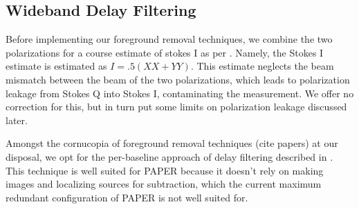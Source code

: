 \documentclass[twocolumn,numberedappendix]{emulateapj} \shorttitle{PSA64}
\begin{document}
%
%



\subsection{Wideband Delay Filtering}\label{sec:wbd_filtering}


Before implementing our foreground removal techniques, we combine the two
polarizations for a course estimate of stokes I as per \cite{moore_et_al2013}.
Namely, the Stokes I estimate is estimated as $I = .5(XX+YY)$. This estimate
neglects the beam mismatch between the beam of the two polarizations, which
leads to polarization leakage from Stokes Q into Stokes I, contaminating the
measurement. We offer no correction for this, but in turn put some limits on
polarization leakage discussed later.

Amongst the cornucopia of foreground removal techniques (cite papers) at our
disposal, we opt for the per-baseline approach of delay filtering described in
\cite{parsons_et_al2012b}. This technique is well suited for PAPER because it
doesn't rely on making images and localizing sources for subtraction, which 
the current maximum redundant configuration of PAPER is not well suited for.
\end{document}
